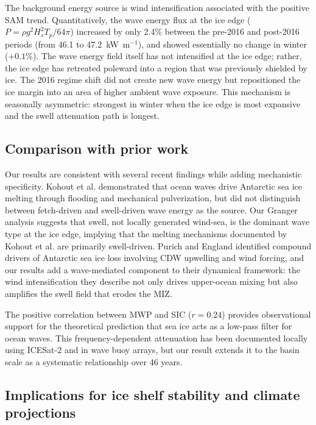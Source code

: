\documentclass[11pt]{article}
\begin{document}
The background energy source is wind intensification associated with the positive SAM trend\cite{Marshall2003}. Quantitatively, the wave energy flux at the ice edge ($P = \rho g^2 H_s^2 T_p / 64\pi$) increased by only 2.4\% between the pre-2016 and post-2016 periods (from 46.1 to 47.2~kW~m$^{-1}$), and showed essentially no change in winter ($+0.1$\%). The wave energy field itself has not intensified at the ice edge; rather, the ice edge has retreated poleward into a region that was previously shielded by ice. The 2016 regime shift did not create new wave energy but repositioned the ice margin into an area of higher ambient wave exposure. This mechanism is seasonally asymmetric: strongest in winter when the ice edge is most expansive and the swell attenuation path is longest.

\subsection{Comparison with prior work}

Our results are consistent with several recent findings while adding mechanistic specificity. Kohout et al.\cite{Kohout2026} demonstrated that ocean waves drive Antarctic sea ice melting through flooding and mechanical pulverization, but did not distinguish between fetch-driven and swell-driven wave energy as the source. Our Granger analysis suggests that swell, not locally generated wind-sea, is the dominant wave type at the ice edge, implying that the melting mechanisms documented by Kohout et al. are primarily swell-driven. Purich and England\cite{Purich2026} identified compound drivers of Antarctic sea ice loss involving CDW upwelling and wind forcing, and our results add a wave-mediated component to their dynamical framework: the wind intensification they describe not only drives upper-ocean mixing but also amplifies the swell field that erodes the MIZ.

The positive correlation between MWP and SIC ($r = 0.24$) provides observational support for the theoretical prediction that sea ice acts as a low-pass filter for ocean waves\cite{Squire2020}. This frequency-dependent attenuation has been documented locally using ICESat-2\cite{Womack2022} and in wave buoy arrays, but our result extends it to the basin scale as a systematic relationship over 46 years.

\subsection{Implications for ice shelf stability and climate projections}
\end{document}

